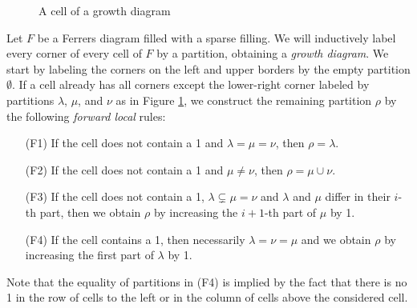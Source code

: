 \begin{figure}[h]
\centering
{}
\caption{A cell of a growth diagram}
\label{figure_growth_cell}
\end{figure}

Let $F$ be a Ferrers diagram filled with a sparse filling. 
We will inductively label every corner of every cell of $F$ by a partition, obtaining a \emph{growth diagram}.
We start by labeling the corners on the left and upper borders by the empty partition $\emptyset$. If a cell
already has all corners except the lower-right corner labeled by partitions $\lambda$, $\mu$, and $\nu$ as in Figure \ref{figure_growth_cell},
we construct the remaining partition $\rho$ by the following \emph{forward local} rules:
\begin{itemize}
\item [(F1)] If the cell does not contain a 1 and $\lambda = \mu = \nu$, then $\rho = \lambda$.
\item [(F2)] If the cell does not contain a 1 and $\mu \neq \nu$, then $\rho = \mu \cup \nu$.
\item [(F3)] If the cell does not contain a 1, $\lambda \subsetneq \mu = \nu$ and $\lambda$ and $\mu$ differ in their $i$-th part,
then we obtain $\rho$ by increasing the $i+1$-th part of $\mu$ by 1.
\item [(F4)] If the cell contains a 1, then necessarily $\lambda = \nu = \mu$ and we obtain $\rho$ by increasing the first
part of $\lambda$ by 1. 
\end{itemize}

Note that the equality of partitions in (F4) is implied by the fact that there is no 1 in the row of cells to the left or 
in the column of cells above the considered cell.

